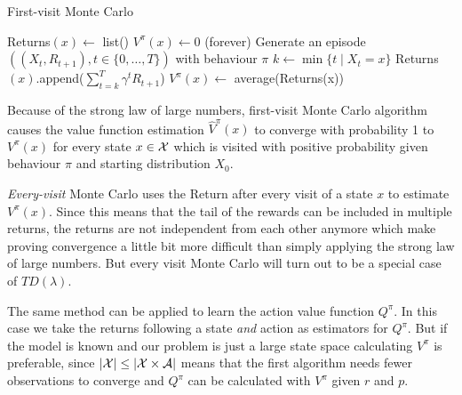 \begin{algorithm}
	\caption{First-visit Monte Carlo}
	\begin{algorithmic}[1]
		 
			\State Returns\((x)\gets\) list()
			\State \(V^\pi(x)\gets 0\)
		\EndFor
		 (forever) 
			\State Generate an episode \(((X_t,R_{t+1}), t\in\{0,\dots,T\})\) with behaviour \(\pi\)
				\State \(k\gets \min\{t \mid X_t=x\}\)
				\State Returns\((x)\).append(\(\sum_{t=k}^T\gamma^tR_{t+1}\))
				\State \(V^\pi(x)\gets\) average(Returns(x))
			\EndFor
		\EndWhile
	\end{algorithmic}
\end{algorithm}

Because of the strong law of large numbers, first-visit Monte Carlo algorithm causes the value function estimation \(\hat{V}^\pi(x)\) to converge with probability 1 to \(V^\pi(x)\) for every state \(x\in\mathcal{X}\) which is visited with positive probability given behaviour \(\pi\) and starting distribution \(X_0\). 

\emph{Every-visit} Monte Carlo uses the Return after every visit of a state \(x\) to estimate \(V^\pi(x)\). Since this means that the tail of the rewards can be included in multiple returns, the returns are not independent from each other anymore which make proving convergence a little bit more difficult than simply applying the strong law of large numbers. But every visit Monte Carlo will turn out to be a special case of \(TD(\lambda)\). 

The same method can be applied to learn the action value function \(Q^\pi\). In this case we take the returns following a state \emph{and} action as estimators for \(Q^\pi\). But if the model is known and our problem is just a large state space calculating \(V^\pi\) is preferable, since \(|\mathcal{X}|\le |\mathcal{X}\times\mathcal{A}|\) means that the first algorithm needs fewer observations to converge and \(Q^\pi\) can be calculated with \(V^\pi\) given \(r\) and \(p\).

